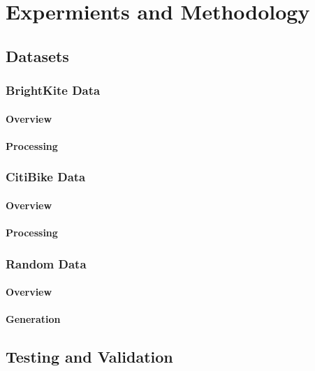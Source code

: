 \chapter{Expermients and Methodology}

\section{Datasets}

\subsection{BrightKite Data}

\subsubsection{Overview}

\subsubsection{Processing}

\subsection{CitiBike Data}

\subsubsection{Overview}

\subsubsection{Processing}

\subsection{Random Data}

\subsubsection{Overview}

\subsubsection{Generation}

\section{Testing and Validation}

